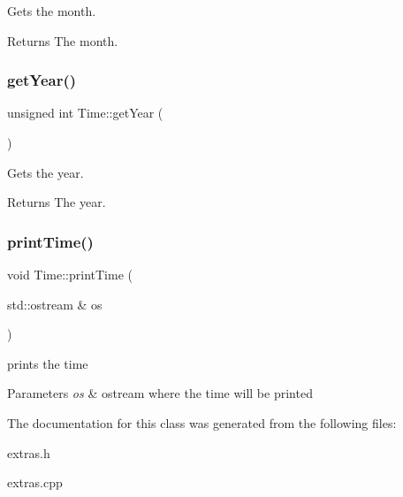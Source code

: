 Gets the month. 

\begin{DoxyReturn}{Returns}
The month. 
\end{DoxyReturn}
\mbox{\label{classTime_ade4d01d38041bb86a2e1ded9fd3cd28e}} 
\subsubsection{\texorpdfstring{get\+Year()}{getYear()}}
{\footnotesize\ttfamily unsigned int Time\+::get\+Year (\begin{DoxyParamCaption}{ }\end{DoxyParamCaption})}



Gets the year. 

\begin{DoxyReturn}{Returns}
The year. 
\end{DoxyReturn}
\mbox{\label{classTime_a79d96e150ff808580fdf43932897130d}} 
\subsubsection{\texorpdfstring{print\+Time()}{printTime()}}
{\footnotesize\ttfamily void Time\+::print\+Time (\begin{DoxyParamCaption}\item[{std\+::ostream \&}]{os }\end{DoxyParamCaption})}



prints the time 


\begin{DoxyParams}{Parameters}
{\em os} & ostream where the time will be printed \\
\hline
\end{DoxyParams}


The documentation for this class was generated from the following files\+:\begin{DoxyCompactItemize}
\item 
extras.\+h\item 
extras.\+cpp\end{DoxyCompactItemize}
